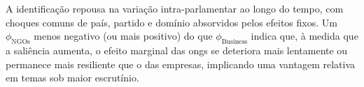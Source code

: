 A identificação repousa na variação intra-parlamentar ao longo do tempo, com choques comuns de país, partido e domínio absorvidos pelos efeitos fixos. Um \(\phi_{\text{NGOs}}\) menos negativo (ou mais positivo) do que \(\phi_{\text{Business}}\) indica que, à medida que a saliência aumenta, o efeito marginal das \acrshort{ong}s se deteriora mais lentamente ou permanece mais resiliente que o das empresas, implicando uma vantagem relativa em temas sob maior escrutínio.
